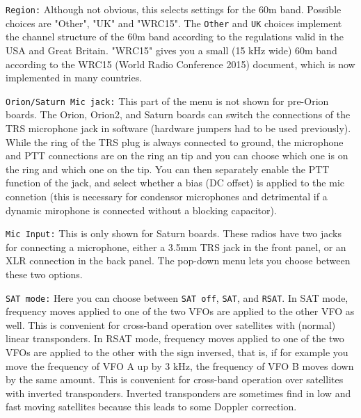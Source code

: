 \documentclass[12pt]{book}
\def\rett#1{\texttt{\color{red}#1}}
\begin{document}
\rett{Region:} Although not obvious, this selects settings for the 60m band. Possible choices are "Other",
 "UK" and "WRC15". The \texttt{Other} and \texttt{UK} choices implement the channel structure of the 60m
 band according to the regulations valid in the USA and Great Britain. "WRC15" gives you a small (15 kHz
 wide) 60m band according to the WRC15 (World Radio Conference 2015) document, which is now implemented in
 many countries.

\rett{Orion/Saturn Mic jack:} This part of the menu is not shown for pre-Orion boards.
The Orion, Orion2, and Saturn boards can switch the connections
 of the TRS microphone jack in software (hardware jumpers had to be used previously).
While the ring of the TRS plug is always connected to ground, the microphone and PTT connections are on the
ring an tip and you can choose which one is on the ring and which one on the tip. You can then separately
enable the PTT function of the jack, and select whether a bias (DC offset) is applied to the mic connetion
(this is necessary for condensor microphones and detrimental if a dynamic mirophone is connected without
a blocking capacitor).

\rett{Mic Input:} This is only shown for Saturn boards. These radios have two jacks for connecting a
microphone, either a 3.5mm TRS jack in the front panel, or an XLR connection in the back panel. The pop-down
menu lets you choose between these two options.

\rett{SAT mode:} Here you can choose between \texttt{SAT off}, \texttt{SAT}, and \texttt{RSAT}. In SAT mode,
frequency moves applied to one of the two VFOs are applied to the other VFO as well. This is convenient
for cross-band operation over satellites with (normal) linear transponders. In RSAT mode, frequency
moves applied to one of the two VFOs are applied to the other with the sign inversed, that is, if
for example you move the frequency of VFO A up by 3 kHz, the frequency of VFO B moves down by the same
amount. This is convenient for cross-band operation over satellites with inverted transponders. Inverted
transponders are sometimes find in low and fast moving satellites because this leads to some Doppler
 correction.
\end{document}
